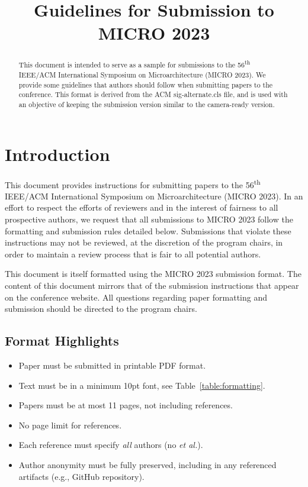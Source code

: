 \documentclass{sig-alternate}
\title{Guidelines for Submission to MICRO 2023}
\begin{document}
\maketitle
\thispagestyle{firstpage}
\pagestyle{plain}




\begin{abstract}

  This document is intended to serve as a sample for submissions to the 56\textsuperscript{th} IEEE/ACM International Symposium on Microarchitecture\textsuperscript{\textregistered} (MICRO 2023). We provide some guidelines that authors should follow when submitting papers to the conference.  This format is derived from the ACM sig-alternate.cls file, and is used with an objective of keeping the submission version similar to the camera-ready version.

\end{abstract}

\section{Introduction}

This document provides instructions for submitting papers to the 56\textsuperscript{th} IEEE/ACM International Symposium on Microarchitecture\textsuperscript{\textregistered} (MICRO 2023).  In an effort to respect the efforts of reviewers and in the interest of fairness to all prospective authors, we request that all submissions to MICRO 2023 follow the formatting and submission rules detailed below. Submissions that violate these instructions may not be reviewed, at the discretion of the program chairs, in order to maintain a review process that is fair to all potential authors. 

This document is itself formatted using the MICRO 2023 submission format. The content of this document mirrors that of the submission instructions that appear on the conference website. All questions regarding paper formatting and submission should be directed to the program chairs.

\subsection{Format Highlights}
\begin{itemize}
\item Paper must be submitted in printable PDF format.
\item Text must be in a minimum 10pt font, see Table~\ref{table:formatting}.
\item Papers must be at most 11 pages, not including references.
\item No page limit for references.
\item Each reference must specify {\em all} authors (no {\em et al.}).
\item Author anonymity must be fully preserved, including in any referenced artifacts (e.g., GitHub repository).
\end{itemize}
\end{document}
